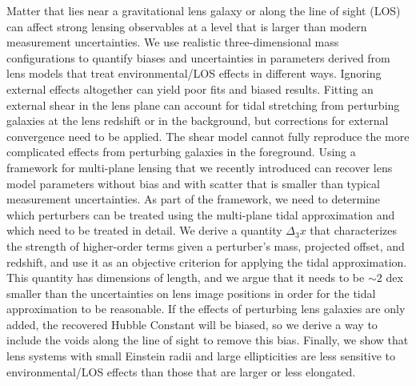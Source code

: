 Matter that lies near a gravitational lens galaxy or along the line of sight (LOS) can affect strong lensing observables at a level that is larger than modern measurement uncertainties. We use realistic three-dimensional mass configurations to quantify biases and uncertainties in parameters derived from lens models that treat environmental/LOS effects in different ways. Ignoring external effects altogether can yield poor fits and biased results. Fitting an external shear in the lens plane can account for tidal stretching from perturbing galaxies at the lens redshift or in the background, but corrections for external convergence need to be applied. The shear model cannot fully reproduce the more complicated effects from perturbing galaxies in the foreground. Using a framework for multi-plane lensing that we recently introduced \citep{McCully14} can recover lens model parameters without bias and with scatter that is smaller than typical measurement uncertainties. As part of the framework, we need to determine which perturbers can be treated using the multi-plane tidal approximation and which need to be treated in detail. We derive a quantity $\Delta_3 x$ that characterizes the strength of higher-order terms given a perturber's mass, projected offset, and redshift, and use it as an objective criterion for applying the tidal approximation. This quantity has dimensions of length, and we argue that it needs to be $\sim 2$ dex smaller than the uncertainties on lens image positions in order for the tidal approximation to be reasonable. If the effects of perturbing lens galaxies are only added, the recovered Hubble Constant will be biased, so we derive a way to include the voids along the line of sight to remove this bias. Finally, we show that lens systems with small Einstein radii and large ellipticities are less sensitive to environmental/LOS effects than those that are larger or less elongated.
  